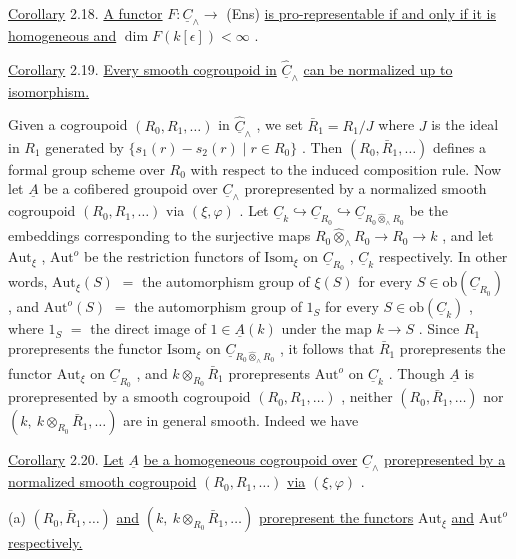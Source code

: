 \underline{Corollary} 2.18.  \underline{A functor}  $F : \underline{C}_\wedge \longrightarrow$ (Ens)  \underline{is pro-representable if and only if it is homogeneous and}  $\dim F(k[\epsilon]) < \infty$  .

\underline{Corollary} 2.19.  \underline{Every smooth cogroupoid in}  $\hat{\underline{C}}_\wedge$  \underline{can be normalized up to isomorphism.}

Given a cogroupoid  $(R_0,R_1,\dots)$  in  $\hat{\underline{C}}_\wedge$ , we set  $\bar{R}_1 = R_1/J$  where  $J$  is the ideal in  $R_1$  generated by  $\{s_1(r) - s_2(r) \mid r \in R_0\}$ . Then  $(R_0,\bar{R}_1,\dots)$  defines a formal group scheme over  $R_0$  with respect to the induced composition rule. Now let  $\underline{A}$  be a cofibered groupoid over  $\underline{C}_\wedge$  prorepresented by a normalized smooth cogroupoid  $(R_0,R_1,\dots)$  via  $(\xi,\varphi)$ . Let  $\underline{C}_k \hookrightarrow \underline{C}_{R_0} \hookrightarrow \underline{C}_{R_0 \hat{\otimes}_\wedge R_0}$  be the embeddings corresponding to the surjective maps  $R_0 \hat{\otimes}_\wedge R_0 \longrightarrow R_0 \longrightarrow k$ , and let  $\mathrm{Aut}_\xi$ , $\mathrm{Aut}^o$  be the restriction functors of  $\mathrm{Isom}_\xi$  on  $\underline{C}_{R_0}$ , $\underline{C}_k$  respectively. In other words,  $\mathrm{Aut}_\xi(S)$ $=$ the automorphism group of  $\xi(S)$  for every  $S \in \mathrm{ob}(\underline{C}_{R_0})$ , and  $\mathrm{Aut}^o(S)$ $=$ the automorphism group of  $1_S$  for every  $S \in \mathrm{ob}(\underline{C}_k)$ , where  $1_S$ $=$ the direct image of  $1 \in \underline{A}(k)$  under the map  $k \to S$ . Since  $R_1$  prorepresents the functor  $\mathrm{Isom}_\xi$  on  $\underline{C}_{R_0 \hat{\otimes}_\wedge R_0}$ , it follows that  $\bar{R}_1$  prorepresents the functor  $\mathrm{Aut}_\xi$  on  $\underline{C}_{R_0}$ , and  $k \otimes_{R_0} \bar{R}_1$  prorepresents  $\mathrm{Aut}^o$  on  $\underline{C}_k$ . Though  $\underline{A}$  is prorepresented by a smooth cogroupoid  $(R_0,R_1,\dots)$  , neither  $(R_0,\bar{R}_1,\dots)$  nor  $(k,\ k \otimes_{R_0} \bar{R}_1,\dots)$  are in general smooth. Indeed we have

\underline{Corollary} 2.20.  \underline{Let}  $\underline{A}$  \underline{be a homogeneous cogroupoid over}  $\underline{C}_\wedge$  \underline{prorepresented by a normalized smooth cogroupoid}  $(R_0,R_1,\dots)$  \underline{via}  $(\xi,\varphi)$  .

(a)  $(R_0,\bar{R}_1,\dots)$  \underline{and}  $(k,\ k \otimes_{R_0} \bar{R}_1,\dots)$  \underline{prorepresent the functors}  $\mathrm{Aut}_\xi$  \underline{and}  $\mathrm{Aut}^o$  \underline{respectively.}

